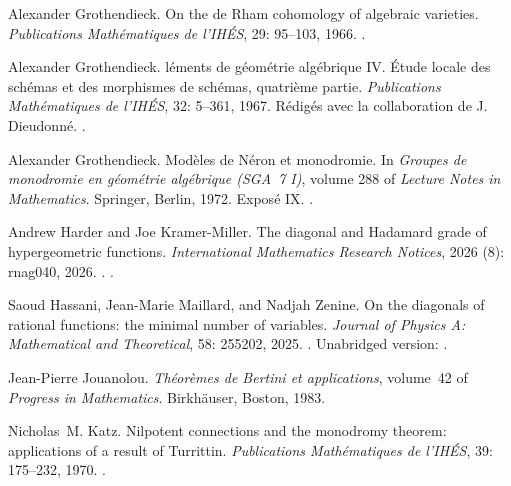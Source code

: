 \documentclass[11pt]{amsart}
\theoremstyle{definition}
\theoremstyle{remark}
\numberwithin{equation}{section}
\begin{document}
\begin{thebibliography}{48}
Alexander Grothendieck.
\newblock On the de {R}ham cohomology of algebraic varieties.
\newblock \emph{Publications Math{\'e}matiques de l'IH{\'E}S}, 29:
  95--103, 1966{}.
\newblock {}.

Alexander Grothendieck.
l{\'e}ments de g{\'e}om{\'e}trie alg{\'e}brique {IV}.
  {{\'E}tude} locale des sch{\'e}mas et des morphismes de sch{\'e}mas,
  quatri{\`e}me partie.
\newblock \emph{Publications Math{\'e}matiques de l'IH{\'E}S}, 32:
  5--361, 1967.
\newblock R{\'e}dig{\'e}s avec la collaboration de J. Dieudonn{\'e}.
\newblock {}.

Alexander Grothendieck.
\newblock Mod{\`e}les de {N}{\'e}ron et monodromie.
\newblock In \emph{Groupes de monodromie en g{\'e}om{\'e}trie alg{\'e}brique
  ({SGA}~7 {I})}, volume 288 of \emph{Lecture Notes in Mathematics}. Springer,
  Berlin, 1972.
\newblock Expos{\'e} {IX}.
\newblock {}.

Andrew Harder and Joe Kramer-Miller.
\newblock The diagonal and {H}adamard grade of hypergeometric functions.
\newblock \emph{International Mathematics Research Notices}, 2026
  (8): rnag040, 2026.
\newblock {}.
\newblock {}.

Saoud Hassani, Jean-Marie Maillard, and Nadjah Zenine.
\newblock On the diagonals of rational functions: the minimal number of
  variables.
\newblock \emph{Journal of Physics A: Mathematical and Theoretical},
  58: 255202, 2025.
\newblock {}.
\newblock Unabridged version: .

Jean-Pierre Jouanolou.
\newblock \emph{Th{\'e}or{\`e}mes de {B}ertini et applications}, volume~42 of
  \emph{Progress in Mathematics}.
\newblock Birkh{\"a}user, Boston, 1983.

Nicholas~M. Katz.
\newblock Nilpotent connections and the monodromy theorem: applications of a
  result of {T}urrittin.
\newblock \emph{Publications Math{\'e}matiques de l'IH{\'E}S}, 39:
  175--232, 1970.
\newblock {}.


\end{thebibliography}
\end{document}
